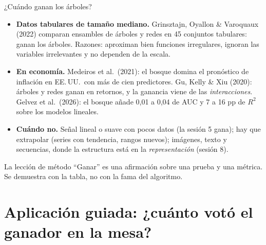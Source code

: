 \documentclass{beamer}
\newcommand{\1}{\mathbb{I}}
\begin{document}
\begin{frame}{¿Cuándo ganan los árboles?}
\small
\begin{itemize}\itemsep4pt
  \item \textbf{Datos tabulares de tamaño mediano.} Grinsztajn, Oyallon \& Varoquaux (2022) comparan ensambles de árboles y redes en 45 conjuntos tabulares: ganan los árboles. Razones: aproximan bien funciones irregulares, ignoran las variables irrelevantes y no dependen de la escala. \pause
  \item \textbf{En economía.} Medeiros et al.\ (2021): el bosque domina el pronóstico de inflación en EE.\,UU.\ con más de cien predictores. Gu, Kelly \& Xiu (2020): árboles y redes ganan en retornos, y la ganancia viene de las \emph{interacciones}. Gelvez et al.\ (2026): el bosque añade 0,01 a 0,04 de AUC y 7 a 16 pp de $R^2$ sobre los modelos lineales. \pause
  \item \textbf{Cuándo no.} Señal lineal o suave con pocos datos (la sesión 5 gana); hay que extrapolar (series con tendencia, rangos nuevos); imágenes, texto y secuencias, donde la estructura está en la \emph{representación} (sesión 8).
\end{itemize}
\pause
\begin{block}{La lección de método}
``Ganar'' es una afirmación sobre una prueba y una métrica. Se demuestra con la tabla, no con la fama del algoritmo.
\end{block}
\end{frame}


\section{Aplicación guiada: ¿cuánto votó el ganador en la mesa?}
\begin{frame}[noframenumbering]
\tableofcontents[currentsection]
\end{frame}
\end{document}
